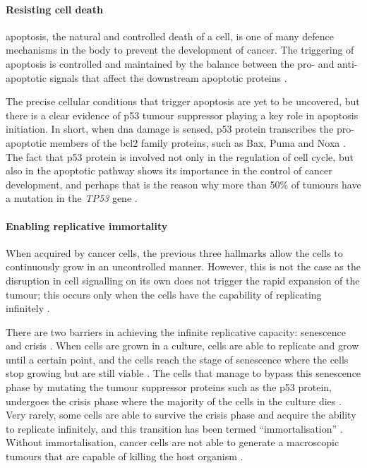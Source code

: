 \paragraph{Resisting cell death}

\noindent
\Gls{apoptosis}, the natural and controlled death of a cell, is one of many defence mechanisms in the body to prevent the development of cancer.
The triggering of \gls{apoptosis} is controlled and maintained by the balance between the pro- and anti-apoptotic signals that affect the downstream apoptotic proteins \citep{Hanahan2011}.

The precise cellular conditions that trigger apoptosis are yet to be uncovered, but there is a clear evidence of p53 tumour suppressor playing a key role in apoptosis initiation.
In short, when \acrshort{dna} damage is sensed, p53 protein transcribes the pro-apoptotic members of the \gls{bcl2} family proteins, such as Bax, Puma and Noxa \citep{Fridman2003,Hanahan2011}.
The fact that p53 protein is involved not only in the regulation of cell cycle, but also in the apoptotic pathway shows its importance in the control of cancer development, and perhaps that is the reason why more than 50\% of tumours have a mutation in the \textit{TP53} gene \citep{Levine1997}.

\paragraph{Enabling replicative immortality}

\noindent
When acquired by cancer cells, the previous three hallmarks allow the cells to continuously grow in an uncontrolled manner.
However, this is not the case as the disruption in cell signalling on its own does not trigger the rapid expansion of the tumour; this occurs only when the cells have the capability of replicating infinitely \citep{Hanahan2000, Hanahan2011}.

There are two barriers in achieving the infinite replicative capacity: senescence and crisis \citep{Hanahan2011}.
When cells are grown in a culture, cells are able to replicate and grow until a certain point, and the cells reach the stage of senescence where the cells stop growing but are still viable \citep{Hanahan2011}.
The cells that manage to bypass this senescence phase by mutating the tumour suppressor proteins such as the p53 protein, undergoes the crisis phase where the majority of the cells in the culture dies \citep{Hanahan2011}.
Very rarely, some cells are able to survive the crisis phase and acquire the ability to replicate infinitely, and this transition has been termed ``immortalisation'' \citep{Hanahan2011, Wright1989}.
Without immortalisation, cancer cells are not able to generate a macroscopic tumours that are capable of killing the host organism \citep{Hanahan2000,Hanahan2011}.


